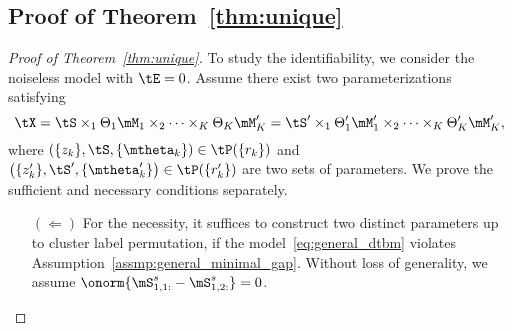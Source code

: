 \documentclass[lettersize,onecolumn,journal]{IEEEtran}
\theoremstyle{definition}
\theoremstyle{definition}
\newcommand{\of}[1]{\left(#1\right)}
\begin{document}
\subsection{Proof of Theorem~\ref{thm:unique}}

\begin{proof}[Proof of Theorem~\ref{thm:unique}] 

To study the identifiability, we consider the noiseless model with $\tE = 0$. Assume there exist two parameterizations satisfying
\begin{equation}\label{eq:another}
    \tX=\tS\times_1\Theta_1 \mM_1 \times_2 \cdots \times_K \Theta_K \mM'_K=\tS'\times_1\Theta'_1 \mM'_1 \times_2 \cdots \times_K \Theta'_K \mM'_K,
\end{equation}
where $\of{ \{z_k\}, \tS, \{ \mtheta_k \} } \in \tP(\{r_k\})$ and $\of{ \{z'_k\}, \tS', \{ \mtheta'_k \} } \in \tP(\{r_k'\})$ are two sets of parameters. We prove the sufficient and necessary conditions separately.

\begin{enumerate}[wide]
    \item[$(\Leftarrow)$] For the necessity, it suffices to construct two distinct parameters up to cluster label permutation, if the model~\eqref{eq:general_dtbm} violates Assumption~\ref{assmp:general_minimal_gap}. Without loss of generality, we assume $\onorm{ \mS_{1,1:}^s - \mS_{1,2:}^s } = 0$.

{
  
}
\end{enumerate}
\end{proof}
\end{document}

